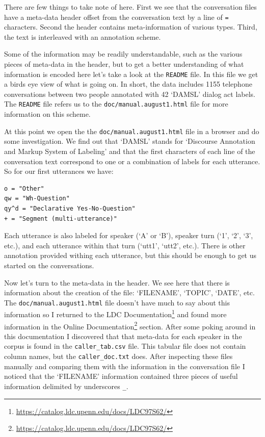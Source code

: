 \documentclass[
]{article}
\DeclareRobustCommand{\href}[2]{#2\footnote{\url{#1}}}
\begin{document}
There are few things to take note of here. First we see that the conversation files have a meta-data header offset from the conversation text by a line of \texttt{=} characters. Second the header contains meta-information of various types. Third, the text is interleaved with an annotation scheme.

Some of the information may be readily understandable, such as the various pieces of meta-data in the header, but to get a better understanding of what information is encoded here let's take a look at the \texttt{README} file. In this file we get a birds eye view of what is going on. In short, the data includes 1155 telephone conversations between two people annotated with 42 `DAMSL' dialog act labels. The \texttt{README} file refers us to the \texttt{doc/manual.august1.html} file for more information on this scheme.

At this point we open the the \texttt{doc/manual.august1.html} file in a browser and do some investigation. We find out that `DAMSL' stands for `Discourse Annotation and Markup System of Labeling' and that the first characters of each line of the conversation text correspond to one or a combination of labels for each utterance. So for our first utterances we have:

\begin{verbatim}
o = "Other"
qw = "Wh-Question"
qy^d = "Declarative Yes-No-Question"
+ = "Segment (multi-utterance)"
\end{verbatim}

Each utterance is also labeled for speaker (`A' or `B'), speaker turn (`1', `2', `3', etc.), and each utterance within that turn (`utt1', `utt2', etc.). There is other annotation provided withing each utterance, but this should be enough to get us started on the conversations.

Now let's turn to the meta-data in the header. We see here that there is information about the creation of the file: `FILENAME', `TOPIC', `DATE', etc. The \texttt{doc/manual.august1.html} file doesn't have much to say about this information so I returned to the \href{https://catalog.ldc.upenn.edu/docs/LDC97S62/}{LDC Documentation} and found more information in the \href{https://catalog.ldc.upenn.edu/docs/LDC97S62/}{Online Documentation} section. After some poking around in this documentation I discovered that that meta-data for each speaker in the corpus is found in the \texttt{caller\_tab.csv} file. This tabular file does not contain column names, but the \texttt{caller\_doc.txt} does. After inspecting these files manually and comparing them with the information in the conversation file I noticed that the `FILENAME' information contained three pieces of useful information delimited by underscores \texttt{\_}.
\end{document}
